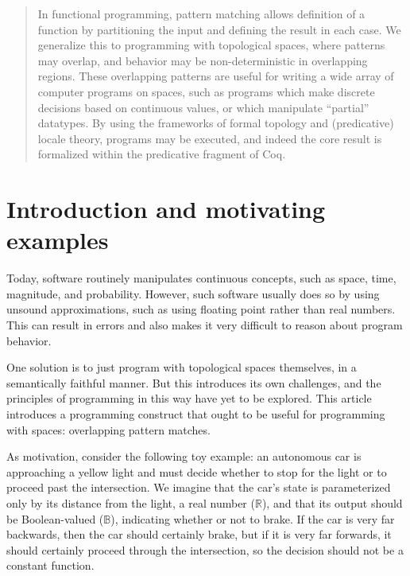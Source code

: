 \documentclass[conference]{IEEEtran}
\newcommand{\R}{\mathbb{R}}
\newcommand{\bool}{\mathbb{B}}
\begin{document}
\begin{abstract}
In functional programming, pattern matching allows definition of a function by partitioning the input and defining the result in each case. We generalize this to programming with topological spaces, where patterns may overlap, and behavior may be non-deterministic in overlapping regions. These overlapping patterns are useful for writing a wide array of computer programs on spaces, such as programs which make discrete decisions based on continuous values, or which manipulate ``partial'' datatypes. By using the frameworks of formal topology and (predicative) locale theory, programs may be executed, and indeed the core result is formalized within the predicative fragment of Coq.
\end{abstract}





%
\IEEEpeerreviewmaketitle


\section{Introduction and motivating examples}

Today, software routinely manipulates continuous concepts, such as space, time, magnitude, and probability. However, such software usually does so by using unsound approximations, such as using floating point rather than real numbers. This can result in errors and also makes it very difficult to reason about program behavior.

One solution is to just program with topological spaces themselves, in a semantically faithful manner. But this introduces its own challenges, and the principles of programming in this way have yet to be explored. This article introduces a programming construct that ought to be useful for programming with spaces: overlapping pattern matches.

As motivation, consider the following toy example: an autonomous car is approaching a yellow light and must decide whether to stop for the light or to proceed past the intersection. We imagine that the car's state is parameterized only by its distance from the light, a real number ($\R$), and that its output should be Boolean-valued ($\bool$), indicating whether or not to brake. If the car is very far backwards, then the car should certainly brake, but if it is very far forwards, it should certainly proceed through the intersection, so the decision should not be a constant function.
\end{document}
